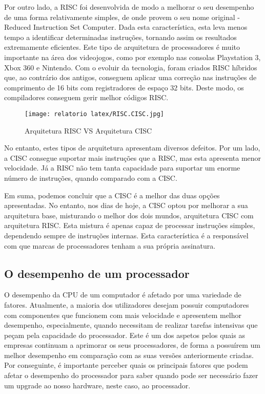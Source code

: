 \documentclass{report}
\begin{document}
Por outro lado, a \ac{RISC} foi desenvolvida de modo a melhorar o seu desempenho de uma forma relativamente simples, de onde provem o seu nome original - Reduced Instruction Set Computer. Dada esta característica, esta leva menos tempo a identificar determinadas instruções, tornando assim os resultados extremamente eficientes. Este tipo de arquitetura de processadores é muito importante na área dos videojogos, como por exemplo nas consolas Playstation 3, Xbox 360 e Nintendo. Com o evoluir da tecnologia, foram criados \ac{RISC} híbridos que, ao contrário dos antigos, conseguem aplicar uma correção nas instruções de comprimento de 16 bits com registradores de espaço 32 bits. Deste modo, os compiladores conseguem gerir melhor códigos \ac{RISC}\cite{Arquitetura2}.



\begin{figure}[h!]
\centering
  \texttt{[image: relatorio latex/RISC.CISC.jpg]}
  \caption{Arquitetura \ac{RISC} VS Arquitetura \ac{CISC}}
  \label{fig: RISC VS CISC}
\end{figure}



No entanto, estes tipos de arquitetura apresentam diversos defeitos. Por um lado, a \ac{CISC} consegue suportar mais instruções que a \ac{RISC}, mas esta apresenta menor velocidade. Já a \ac{RISC} não tem tanta capacidade para suportar um enorme número de instruções, quando comparado com a \ac{CISC}\cite{Arquitetura1}. 

Em suma, podemos concluir que a \ac{CISC} é a melhor das duas opções apresentadas. No entanto, nos dias de hoje, a \ac{CISC} optou por melhorar a sua arquitetura base, misturando o melhor dos dois mundos, arquitetura \ac{CISC} com arquitetura \ac{RISC}. Esta mistura é apenas capaz de processar instruções simples, dependendo sempre de instruções internas. Esta característica  é a responsável com que marcas de processadores tenham a sua própria assinatura\cite{Arquitetura1}.




\subsection{O desempenho de um processador}
O desempenho da \ac{CPU} de um computador é afetado por uma variedade de fatores. Atualmente, a maioria dos utilizadores desejam possuir computadores com componentes que funcionem com mais velocidade e apresentem melhor desempenho, especialmente, quando necessitam de realizar tarefas intensivas que peçam pela capacidade do processador. Este é um dos aspetos pelos quais as empresas continuam a aprimorar os seus processadores, de forma a possuírem um melhor desempenho em comparação com as suas versões anteriormente criadas. Por conseguinte, é importante perceber quais os principais fatores que podem afetar o desempenho do processador para saber quando pode ser necessário fazer um upgrade ao nosso hardware, neste caso, ao processador\cite{Desempenho2}.
\end{document}
